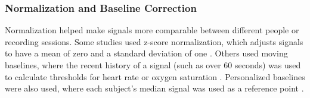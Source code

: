 \subsubsection{Normalization and Baseline Correction}
Normalization helped make signals more comparable between different people or recording sessions. Some studies used z-score normalization, which adjusts signals to have a mean of zero and a standard deviation of one \cite{Nasseri2021-xn}. Others used moving baselines, where the recent history of a signal (such as over 60 seconds) was used to calculate thresholds for heart rate or oxygen saturation \cite{Cogan2015-lu}. Personalized baselines were also used, where each subject’s median signal was used as a reference point \cite{Jiang2022-zu}.
